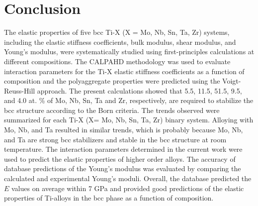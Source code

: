 \section{Conclusion}

The elastic properties of five bcc Ti-X (X = Mo, Nb, Sn, Ta, Zr) systems, including the elastic stiffness coefficients, bulk modulus, shear modulus, and Young's modulus, were systematically studied using first-principles calculations at different compositions. The CALPAHD methodology was used to evaluate interaction parameters for the Ti-X elastic stiffness coefficients as a function of composition and the polyaggregate properties were predicted using the Voigt-Reuss-Hill approach. The present calculations showed that 5.5, 11.5, 51.5, 9.5, and 4.0 at. \% of Mo, Nb, Sn, Ta and Zr, respectively, are required to stabilize the bcc structure according to the Born criteria. The trends observed were summarized for each Ti-X (X= Mo, Nb, Sn, Ta, Zr) binary system. Alloying with Mo, Nb, and Ta resulted in similar trends, which is probably because Mo, Nb, and Ta are strong bcc stabilizers and stable in the bcc structure at room temperature. The interaction parameters determined in the current work were used to predict the elastic properties of higher order alloys. The accuracy of database predictions of the Young's modulus was evaluated by comparing the calculated and experimental Young's moduli. Overall, the database predicted the $E$ values on average within 7 GPa and provided good predictions of the elastic properties of Ti-alloys in the bcc phase as a function of composition. 

